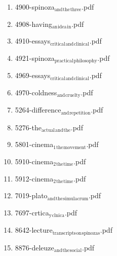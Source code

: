 \documentclass[11pt]{article}
\begin{document}
\begin{enumerate}
\begin{enumerate}
\begin{enumerate}
\item 4900-spinoza$_{\text{and}}$$_{\text{the}}$$_{\text{three}}$.pdf
\label{sec-1-1-1-1-11-29-19-23-32}

\item 4908-having$_{\text{an}}$$_{\text{idea}}$$_{\text{in}}$.pdf
\label{sec-1-1-1-1-11-29-19-23-33}

\item 4910-essays$_{\text{critical}}$$_{\text{and}}$$_{\text{clinical}}$.pdf
\label{sec-1-1-1-1-11-29-19-23-34}

\item 4921-spinoza$_{\text{practical}}$$_{\text{philosophy}}$.pdf
\label{sec-1-1-1-1-11-29-19-23-35}

\item 4969-essays$_{\text{critical}}$$_{\text{and}}$$_{\text{clinical}}$.pdf
\label{sec-1-1-1-1-11-29-19-23-36}

\item 4970-coldness$_{\text{and}}$$_{\text{cruelty}}$.pdf
\label{sec-1-1-1-1-11-29-19-23-37}

\item 5264-difference$_{\text{and}}$$_{\text{repetition}}$.pdf
\label{sec-1-1-1-1-11-29-19-23-38}

\item 5276-the$_{\text{actual}}$$_{\text{and}}$$_{\text{the}}$.pdf
\label{sec-1-1-1-1-11-29-19-23-39}

\item 5801-cinema$_{\text{1}}$$_{\text{the}}$$_{\text{movement}}$.pdf
\label{sec-1-1-1-1-11-29-19-23-40}

\item 5910-cinema$_{\text{2}}$$_{\text{the}}$$_{\text{time}}$.pdf
\label{sec-1-1-1-1-11-29-19-23-41}

\item 5912-cinema$_{\text{2}}$$_{\text{the}}$$_{\text{time}}$.pdf
\label{sec-1-1-1-1-11-29-19-23-42}

\item 7019-plato$_{\text{and}}$$_{\text{the}}$$_{\text{simulacrum}}$.pdf
\label{sec-1-1-1-1-11-29-19-23-43}

\item 7697-crtica$_{\text{y}}$$_{\text{clnica}}$.pdf
\label{sec-1-1-1-1-11-29-19-23-44}

\item 8642-lecture$_{\text{transcripts}}$$_{\text{on}}$$_{\text{spinozas}}$.pdf
\label{sec-1-1-1-1-11-29-19-23-45}

\item 8876-deleuze$_{\text{and}}$$_{\text{the}}$$_{\text{social}}$.pdf
\label{sec-1-1-1-1-11-29-19-23-46}


\end{enumerate}
\end{enumerate}
\end{enumerate}
\end{document}
